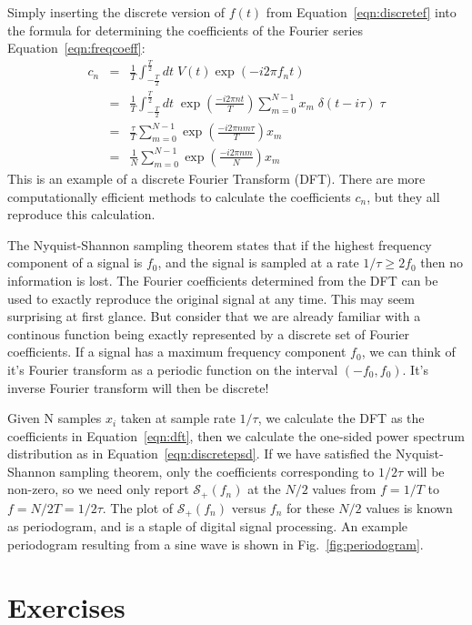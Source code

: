 \documentclass[12pt]{article}
\begin{document}
Simply inserting the discrete version of $f(t)$ from Equation~\ref{eqn:discretef} into the formula for determining the coefficients of the Fourier series Equation~\ref{eqn:freqcoeff}:
\begin{eqnarray}
c_n &=& \frac{1}{T} \int_{-\frac{T}{2}}^{\frac{T}{2}} dt \; V(t) \exp(-i2\pi f_n t) \nonumber \\
&=& \frac{1}{T} \int_{-\frac{T}{2}}^{\frac{T}{2}} dt \; \exp\left(\frac{-i2\pi n t}{T} \right) \sum_{m=0}^{N-1} x_m\; 
\delta(t - i\tau) \; \tau \nonumber \\
&=& \frac{\tau}{T}  \sum_{m=0}^{N-1} \exp\left(\frac{-i2\pi n m \tau }{T} \right)  x_m \nonumber \\
&=& \frac{1}{N}  \sum_{m=0}^{N-1} \exp\left(\frac{-i2\pi n m }{N} \right)  x_m \label{eqn:dft}
\end{eqnarray}
This is an example of a discrete Fourier Transform (DFT).  There are more computationally efficient methods to calculate the coefficients $c_n$, but they all reproduce this calculation.  

The Nyquist-Shannon sampling theorem states that if the highest frequency component of a signal is $f_0$, and the signal is sampled at a rate $1/\tau \geq 2f_0$ then no information is lost.  The Fourier coefficients determined from the DFT can be used to exactly reproduce the original signal at any time.  This may seem surprising at first glance.  But consider that we are already familiar with a continous function being exactly represented by a discrete set of Fourier coefficients.  If a signal has a maximum frequency component $f_0$, we can think of it's Fourier transform as a periodic function on the interval $(-f_0, f_0)$.  It's inverse Fourier transform will then be discrete!

Given N samples $x_i$ taken at sample rate $1/\tau$, we calculate the DFT as the coefficients in Equation~\ref{eqn:dft}, then we calculate the one-sided power spectrum distribution as in Equation~\ref{eqn:discretepsd}.  If we have satisfied the Nyquist-Shannon sampling theorem, only the coefficients corresponding to $1/2\tau$ will be non-zero, so we need only report $\mathcal{S}_{+}(f_n)$ at the $N/2$ values from $f=1/T$ to $f=N/2T=1/2\tau$.  The plot of $\mathcal{S}_{+}(f_n)$ versus $f_n$ for these $N/2$ values is known as periodogram, and is a staple of digital signal processing.  An example periodogram resulting from a sine wave is shown in Fig.~\ref{fig:periodogram}.



\section{Exercises}
\end{document}
